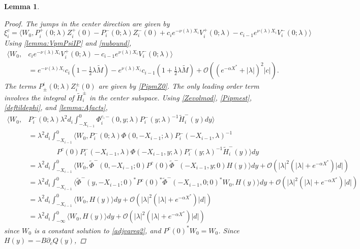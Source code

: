 \documentclass[10pt,reqno]{amsart}
\theoremstyle{plain}
\newtheorem{lemma}[theorem]{Lemma}
\theoremstyle{definition}
\theoremstyle{remark}
\numberwithin{theorem}{section}
\numberwithin{equation}{section}
\begin{document}
\begin{lemma}
\begin{proof}
The jumps in the center direction are given by
\[
\xi_i^c = 
\langle W_0, P_i^+(0; \lambda) Z_i^+(0) - P_i^-(0; \lambda) Z_i^-(0) + c_i e^{-\nu(\lambda)X_i}V_i^+(0; \lambda) - c_{i-1} e^{\nu(\lambda)X_i} V_i^-(0; \lambda) \rangle 
\]
Using \cref{lemma:VpmPsiIP} and \cref{nubound},
\begin{align*}
\langle W_0, &c_i e^{-\nu(\lambda)X_i}V_i^+(0; \lambda) - c_{i-1} e^{\nu(\lambda)X_i} V_i^-(0; \lambda) \rangle \\
&= e^{-\nu(\lambda)X_i}c_i\left( 1 - \frac{1}{2}\lambda \tilde{M} \right) 
- e^{\nu(\lambda)X_i}c_{i-1}\left( 1 + \frac{1}{2}\lambda \tilde{M} \right) + \mathcal{O}\left( (e^{-\alpha X^*} +|\lambda|)^2 |c|\right).
\end{align*}
The terms $P^i_\pm(0; \lambda) Z_i^\pm(0)$ are given by \cref{PipmZ0}. The only leading order term involves the integral of $\tilde{H}_i^\pm$ in the center subspace. Using \cref{Zevolmod}, \cref{Pipmest}, \cref{deftildephi}, and \cref{lemma:Afacts},
\begin{equation*}
\begin{aligned}
\langle W_0, &P_i^-(0; \lambda) \lambda^2 d_i \int_{-X_{i-1}}^0 \Phi_i^{c,-}(0, y; \lambda) P_i^-(y; \lambda)^{-1} \tilde{H}_i^-(y) dy \rangle \\
&= \lambda^2 d_i \int_{-X_{i-1}}^0 \langle W_0, P_i^-(0; \lambda) \Phi(0, -X_{i-1}; \lambda) P_i^-(-X_{i-1}, \lambda)^{-1} \\
&\qquad \qquad
P^c(0) P_i^-(-X_{i-1}, \lambda) \Phi(-X_{i-1}, y; \lambda) P_i^-(y; \lambda)^{-1} \tilde{H}_i^-(y) \rangle dy \\
&= \lambda^2 d_i \int_{-X_{i-1}}^0 \langle W_0, \tilde{\Phi}^-(0, -X_{i-1}; 0) 
P^c(0) \tilde{\Phi}^-(-X_{i-1}, y; 0) H(y) \rangle dy + \mathcal{O}(|\lambda|^2 (|\lambda| + e^{- \alpha X^*}) |d|) \\
&= \lambda^2 d_i \int_{-X_{i-1}}^0 \langle \tilde{\Phi}^-(y, -X_{i-1}; 0)^* P^c(0)^* \tilde{\Phi}^-(-X_{i-1}, 0; 0)^* W_0,
 H(y) \rangle dy + \mathcal{O}(|\lambda|^2 (|\lambda| + e^{- \alpha X^*}) |d|) \\
&= \lambda^2 d_i \int_{-X_{i-1}}^0 \langle W_0, H(y) \rangle dy + \mathcal{O}(|\lambda|^2 (|\lambda| + e^{- \alpha X^*}) |d|) \\
&= \lambda^2 d_i \int_{-\infty}^0 \langle W_0, H(y) \rangle dy + \mathcal{O}(|\lambda|^2 (|\lambda| + e^{- \alpha X^*}) |d|)
\end{aligned}
\end{equation*}
since $W_0$ is a constant solution to \cref{adjvareq2}, and $P^c(0)^* W_0 = W_0$. Since $H(y) = -B \partial_c Q(y)$,

\end{proof}
\end{lemma}
\end{document}
